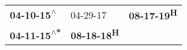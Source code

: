 \begin{supertabular}{lll}
  \textbf{04-10-15\textsuperscript{$\wedge$}} &            04-29-17\textsuperscript{} &  \textbf{08-17-19\textsuperscript{H}} \\
 \textbf{04-11-15\textsuperscript{$\wedge$*}} &  \textbf{08-18-18\textsuperscript{H}} &                                       \\
\end{supertabular}

